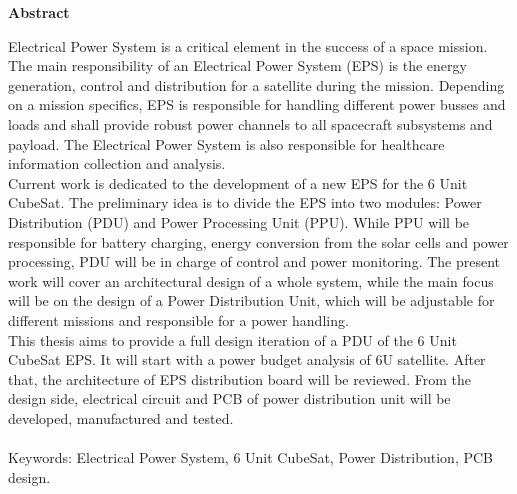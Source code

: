\thispagestyle{empty}
\vspace*{1.0cm}

\begin{center}
    \textbf{Abstract}
\end{center}

\vspace*{0.5cm}

\noindent

Electrical Power System is a critical element in the success of a space mission. The main responsibility of an Electrical Power System (EPS) is the energy generation, control and distribution for a satellite during the mission. Depending on a mission specifics, EPS is responsible for handling different power busses and loads and shall provide robust power channels to all spacecraft subsystems and payload. The Electrical Power System is also responsible for healthcare information collection and analysis. 
\\

Current work is dedicated to the development of a new EPS for the 6 Unit CubeSat. The preliminary idea is to divide the EPS into two modules: Power Distribution (PDU) and Power Processing Unit (PPU). While PPU will be responsible for battery charging, energy conversion from the solar cells and power processing, PDU will be in charge of control and power monitoring. The present work will cover an architectural design of a whole system, while the main focus will be on the design of a Power Distribution Unit, which will be adjustable for different missions and responsible for a power handling.
\\

This thesis aims to provide a full design iteration of a PDU of the 6 Unit CubeSat EPS. It will start with a power budget analysis of 6U satellite. After that, the architecture of EPS distribution board will be reviewed. From the design side, electrical circuit and PCB of power distribution unit will be developed, manufactured and tested.
\\
\\
Keywords: Electrical Power System, 6 Unit CubeSat, Power Distribution, PCB design.